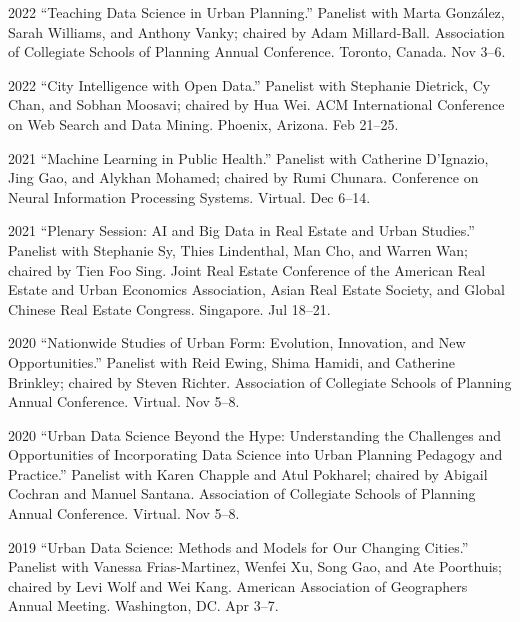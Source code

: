 \documentclass[11pt,letterpaper]{report} %
\begin{document}
    \begin{tablist}

        \item[2022] \tab{}\enquote{Teaching Data Science in Urban Planning.} Panelist with Marta Gonz{\'a}lez, Sarah Williams, and Anthony Vanky; chaired by Adam Millard-Ball. Association of Collegiate Schools of Planning Annual Conference. Toronto, Canada. Nov 3--6.

        \item[2022] \tab{}\enquote{City Intelligence with Open Data.} Panelist with Stephanie Dietrick, Cy Chan, and Sobhan Moosavi; chaired by Hua Wei. ACM International Conference on Web Search and Data Mining. Phoenix, Arizona. Feb 21--25.

        \item[2021] \tab{}\enquote{Machine Learning in Public Health.} Panelist with Catherine D'Ignazio, Jing Gao, and Alykhan Mohamed; chaired by Rumi Chunara. Conference on Neural Information Processing Systems. Virtual. Dec 6--14.

        \item[2021] \tab{}\enquote{Plenary Session: AI and Big Data in Real Estate and Urban Studies.} Panelist with Stephanie Sy, Thies Lindenthal, Man Cho, and Warren Wan; chaired by Tien Foo Sing. Joint Real Estate Conference of the American Real Estate and Urban Economics Association, Asian Real Estate Society, and Global Chinese Real Estate Congress. Singapore. Jul 18--21.

        \item[2020] \tab{}\enquote{Nationwide Studies of Urban Form: Evolution, Innovation, and New Opportunities.} Panelist with Reid Ewing, Shima Hamidi, and Catherine Brinkley; chaired by Steven Richter. Association of Collegiate Schools of Planning Annual Conference. Virtual. Nov 5--8.

        \item[2020] \tab{}\enquote{Urban Data Science Beyond the Hype: Understanding the Challenges and Opportunities of Incorporating Data Science into Urban Planning Pedagogy and Practice.} Panelist with Karen Chapple and Atul Pokharel; chaired by Abigail Cochran and Manuel Santana. Association of Collegiate Schools of Planning Annual Conference. Virtual. Nov 5--8.

        \item[2019] \tab{}\enquote{Urban Data Science: Methods and Models for Our Changing Cities.} Panelist with Vanessa Frias-Martinez, Wenfei Xu, Song Gao, and Ate Poorthuis; chaired by Levi Wolf and Wei Kang. American Association of Geographers Annual Meeting. Washington, DC\@. Apr 3--7.


\end{tablist}
\end{document}
